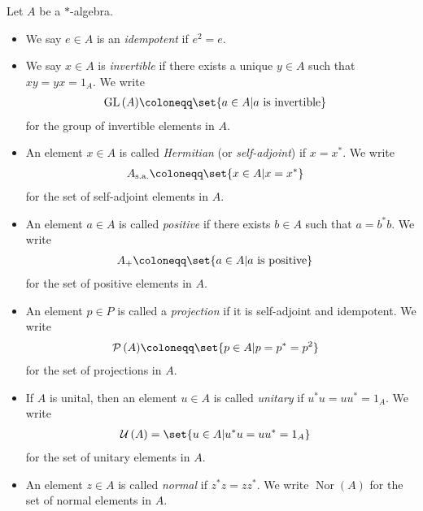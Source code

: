 \begin{definition}\label{def:distinguished_elements_of_algebras}
  Let $A$ be a $\ast$-algebra.
  \begin{itemize}
    \item We say $e\in A$ is an \textit{idempotent} if $e^2 = e$.
    \item We say $x\in A$ is \textit{invertible} if there exists a unique $y\in A$ such that $xy = yx = 1_A$. We write
      \begin{align*}
        \text{GL}\left(A\right) &\coloneq \set{a\in A | a\text{ is invertible}}
      \end{align*}
      for the group of invertible elements in $A$.
    \item An element $x\in A$ is called \textit{Hermitian} (or \textit{self-adjoint}) if $x = x^{\ast}$. We write
      \begin{align*}
        A_{\sa} &\coloneq \set{x\in A | x = x^{\ast}}
      \end{align*}
      for the set of self-adjoint elements in $A$.
    \item An element $a\in A$ is called \textit{positive} if there exists $b\in A$ such that $a = b^{\ast}b$. We write
      \begin{align*}
        A_{+} &\coloneq \set{a\in A | a\text{ is positive}}
      \end{align*}
      for the set of positive elements in $A$.
    \item An element $p\in P$ is called a \textit{projection} if it is self-adjoint and idempotent. We write
      \begin{align*}
        \mathcal{P}\left(A\right) &\coloneq \set{p\in A | p = p^{\ast} = p^2}
      \end{align*}
      for the set of projections in $A$.
    \item If $A$ is unital, then an element $u\in A$ is called \textit{unitary} if $u^{\ast}u = uu^{\ast} = 1_A$. We write
      \begin{align*}
        \mathcal{U}\left(A\right) &= \set{u\in A | u^{\ast}u = uu^{\ast} = 1_A}
      \end{align*}
      for the set of unitary elements in $A$.
    \item An element $z\in A$ is called \textit{normal} if $z^{\ast}z = zz^{\ast}$. We write $\operatorname{Nor}\left(A\right)$ for the set of normal elements in $A$.
  \end{itemize}
\end{definition}
